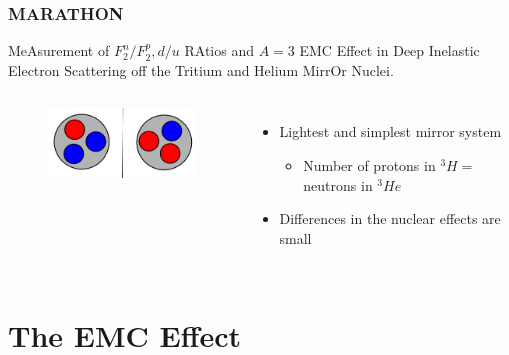 \documentclass[12pt]{beamer}
\begin{document}
\begin{frame}
\frametitle{MARATHON}
\vspace{-10pt}
\begin{block}{}
MeAsurement of $F^n_2/F^p_2, d/u$ RAtios and $A=3$ EMC Effect in Deep Inelastic Electron Scattering off the Tritium and Helium MirrOr Nuclei.
\vspace{-10pt}
\begin{columns}[t]
	
	\vspace{-10pt}	
	\hspace{-10pt}
	\begin{figure}
		\includegraphics[width =5cm]{../images/mirror}
	\end{figure}
	
	\vspace{10pt}
	\begin{itemize}
		\item Lightest and simplest mirror system
		\begin{itemize}
			\item  Number of protons in $^3H =$ neutrons in $^3He$
		\end{itemize}
		\item Differences in the nuclear effects are small
	\end{itemize}
	
	
\end{columns}
\end{block}
\end{frame}

\section[EMC]{The EMC Effect}
\end{document}
